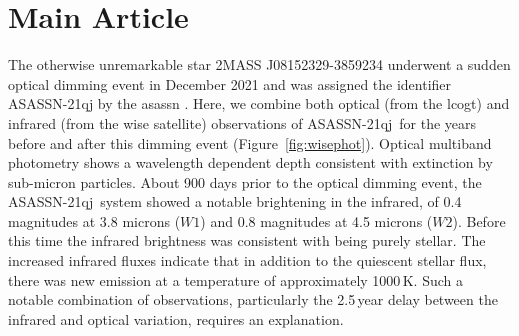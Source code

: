 \documentclass[sn-nature,oneside]{sn-jnl}%
\newcommand{\asas}{ASASSN-21qj}
\begin{document}

\maketitle





\section{Main Article}\label{sec1}






The otherwise unremarkable star 2MASS J08152329-3859234 underwent a sudden optical dimming event in December 2021 \cite{RizzoSmith21,RizzoSmith22} and was assigned the identifier \asas{} by the \gls{asassn} \citep{shappee_man_2014,kochanek_all-sky_2017}.
%
Here, we combine both optical (from the \gls{lcogt}) and infrared (from the \gls{wise} satellite) observations of \asas~for the years before and after this dimming event (Figure~\ref{fig:wisephot}). 
%
Optical multiband photometry shows a wavelength dependent depth consistent with extinction by sub-micron particles.
%
About 900 days prior to the optical dimming event, the \asas~system showed a notable brightening in the infrared, of 0.4 magnitudes at 3.8 microns ($W1$) and 0.8 magnitudes at 4.5 microns ($W2$).
%
Before this time the infrared brightness was consistent with being purely stellar.
%
The increased infrared fluxes indicate that in addition to the quiescent stellar flux, there was new emission at a temperature of approximately 1000\,K.
%
Such a notable combination of observations, particularly the 2.5\,year delay between the infrared and optical variation, requires an explanation.
\end{document}
